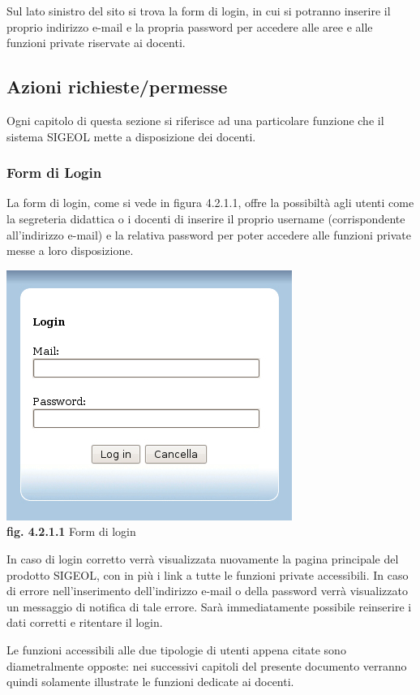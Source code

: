 \documentclass[11pt,a4paper]{article}
\begin{document}
Sul lato sinistro del sito si trova la form di login, in cui si potranno inserire il proprio indirizzo e-mail e la propria password per accedere alle aree e alle funzioni private riservate ai docenti.
\subsection{Azioni richieste/permesse}
Ogni capitolo di questa sezione si riferisce ad una particolare funzione che il sistema SIGEOL mette a disposizione dei docenti.
\subsubsection{Form di Login}
La form di login, come si vede in figura 4.2.1.1, offre la possibiltà agli utenti come la segreteria didattica o i docenti di inserire il proprio username (corrispondente all'indirizzo e-mail) e la relativa password per poter accedere alle funzioni private messe a loro disposizione.

\begin{center}
	\includegraphics[scale=0.5]{images/login.jpg}\\
	\textbf{fig. 4.2.1.1} Form di login\\
\end{center}
\bigskip

In caso di login corretto verrà visualizzata nuovamente la pagina principale del prodotto SIGEOL, con in più i link a tutte le funzioni private accessibili.
In caso di errore nell'inserimento dell'indirizzo e-mail o della password verrà visualizzato un messaggio di notifica di tale errore.
Sarà immediatamente possibile reinserire i dati corretti e ritentare il login.

Le funzioni accessibili alle due tipologie di utenti appena citate sono diametralmente opposte: nei successivi capitoli del presente documento verranno quindi solamente illustrate le funzioni dedicate ai docenti.
\end{document}
